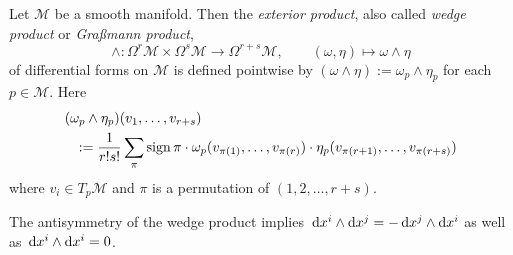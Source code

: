 \begin{definition}
	\cites[139]{Jaenich-1992}
	Let $\mathscr{M}$ be a smooth manifold. Then the 
	\emph{exterior product},
	also called \emph{wedge product}
	or \emph{Graßmann product},
	\begin{equation}
		\wedge: \Omega^r \mathscr{M} \times \Omega^s \mathscr{M} \to \Omega^{r+s} \mathscr{M},
		\qquad
		(\omega, \eta) \mapsto \omega \wedge \eta
	\end{equation}
	of differential forms on $\mathscr{M}$ is defined
	pointwise by $(\omega \wedge \eta) := \omega_p \wedge \eta_p$ for each $p \in \mathscr{M}$.
	Here
	\begin{eqnarray*}
		\lefteqn{(\omega_p \wedge \eta_p) (v_1, \ldots, v_{r+s})}
		\\
		& & 
		:=
		\frac{1}{r!s!} \sum_{\pi} \mathrm{sign} \, \pi \cdot
		\omega_p(v_{\pi(1)}, \ldots, v_{\pi(r)}) \cdot
		\eta_p(v_{\pi(r+1)}, \ldots, v_{\pi(r+s)})
	\end{eqnarray*}
	where $v_i \in T_p \mathscr{M}$ and $\pi$ is a permutation of $(1,2, \ldots, r+s)$.
\end{definition}

\begin{bem}
	The antisymmetry of the wedge product implies 
	$\,\mathrm{d} x^i \wedge \mathrm{d} x^j = - \,\mathrm{d} x^j \wedge \mathrm{d} x^i$
	as well as 
	$\,\mathrm{d} x^i \wedge \mathrm{d} x^i = 0$.
	\cite[307]{Teubner-Taschenbuch-1}
\end{bem}

